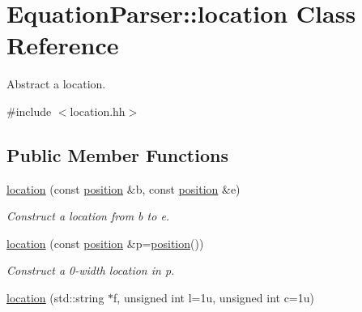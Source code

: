 \hypertarget{classEquationParser_1_1location}{}\section{Equation\+Parser\+:\+:location Class Reference}
\label{classEquationParser_1_1location}


Abstract a location.  




{\ttfamily \#include $<$location.\+hh$>$}

\subsection*{Public Member Functions}
\begin{DoxyCompactItemize}
\item 
\hyperlink{classEquationParser_1_1location_a92b5f6e32ea3eabe14f537698b9f4563}{location} (const \hyperlink{classEquationParser_1_1position}{position} \&b, const \hyperlink{classEquationParser_1_1position}{position} \&e)\hypertarget{classEquationParser_1_1location_a92b5f6e32ea3eabe14f537698b9f4563}{}\label{classEquationParser_1_1location_a92b5f6e32ea3eabe14f537698b9f4563}

\begin{DoxyCompactList}\small\item\em Construct a location from {\itshape b} to {\itshape e}. \end{DoxyCompactList}\item 
\hyperlink{classEquationParser_1_1location_a461e436649b6fae8e2cde43e4140f8f3}{location} (const \hyperlink{classEquationParser_1_1position}{position} \&p=\hyperlink{classEquationParser_1_1position}{position}())\hypertarget{classEquationParser_1_1location_a461e436649b6fae8e2cde43e4140f8f3}{}\label{classEquationParser_1_1location_a461e436649b6fae8e2cde43e4140f8f3}

\begin{DoxyCompactList}\small\item\em Construct a 0-\/width location in {\itshape p}. \end{DoxyCompactList}\item 
\hyperlink{classEquationParser_1_1location_a00c520c87490f3dee70875782480256f}{location} (std\+::string $\ast$f, unsigned int l=1u, unsigned int c=1u)\hypertarget{classEquationParser_1_1location_a00c520c87490f3dee70875782480256f}{}\label{classEquationParser_1_1location_a00c520c87490f3dee70875782480256f}


\end{DoxyCompactItemize}
